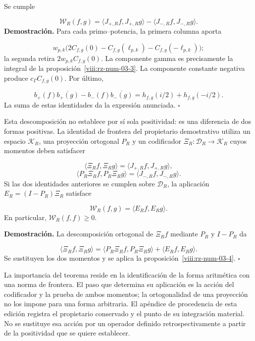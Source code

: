 Se cumple

\[
\mathscr W_R(f,g)
=\langle J_{+,R}f,J_{+,R}g\rangle
-\langle J_{-,R}f,J_{-,R}g\rangle.
\]
\textbf{Demostración.} Para cada primo–potencia, la primera columna aporta

\[
w_{p,k}\bigl(2C_{f,g}(0)
-C_{f,g}(\ell_{p,k})-C_{f,g}(-\ell_{p,k})\bigr);
\]
la segunda retira \(2w_{p,k}C_{f,g}(0)\). La componente gamma es precisamente la integral de la proposición~\ref{viii:rz-num-03-3}. La componente constante negativa produce \(c_\Gamma C_{f,g}(0)\). Por último,

\[
b_+(f)\overline{b_+(g)}-b_-(f)\overline{b_-(g)}
=h_{f,g}(i/2)+h_{f,g}(-i/2).
\]
La suma de estas identidades da la expresión anunciada. \hfill\(\square\)

Esta descomposición no establece por sí sola positividad: es una diferencia de dos formas positivas. La identidad de frontera del propietario demostrativo utiliza un espacio \(\mathcal K_R\), una proyección ortogonal \(P_R\) y un codificador \(\Xi_R:\mathcal D_R\to\mathcal K_R\) cuyos momentos deben satisfacer

\[
\langle\Xi_Rf,\Xi_Rg\rangle
=\langle J_{+,R}f,J_{+,R}g\rangle,
\]
\[
\langle P_R\Xi_Rf,P_R\Xi_Rg\rangle
=\langle J_{-,R}f,J_{-,R}g\rangle.
\]
Si las dos identidades anteriores se cumplen sobre \(\mathcal D_R\), la aplicación \(E_R=(I-P_R)\Xi_R\) satisface

\[
\mathscr W_R(f,g)=\langle E_Rf,E_Rg\rangle.
\]
En particular, \(\mathscr W_R(f,f)\geq0\).

\textbf{Demostración.} La descomposición ortogonal de \(\Xi_Rf\) mediante \(P_R\) y \(I-P_R\) da

\[
\langle\Xi_Rf,\Xi_Rg\rangle
=\langle P_R\Xi_Rf,P_R\Xi_Rg\rangle
+\langle E_Rf,E_Rg\rangle.
\]
Se sustituyen los dos momentos y se aplica la proposición~\ref{viii:rz-num-03-4}. \hfill\(\square\)

La importancia del teorema reside en la identificación de la forma aritmética con una norma de frontera. El paso que determina su aplicación es la acción del codificador y la prueba de ambos momentos; la ortogonalidad de una proyección no los impone para una forma arbitraria. El apéndice de procedencia de esta edición registra el propietario conservado y el punto de su integración material. No se sustituye esa acción por un operador definido retrospectivamente a partir de la positividad que se quiere establecer.

